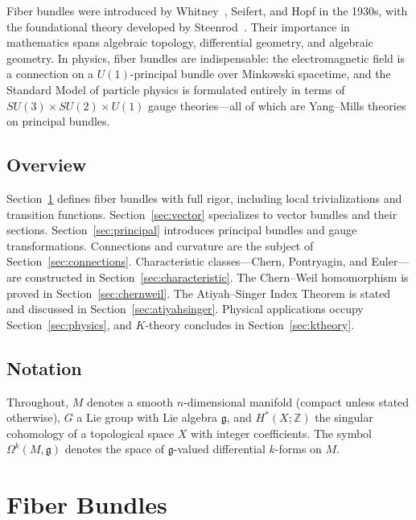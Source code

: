 \documentclass[12pt,a4paper]{amsart}
\theoremstyle{definition}
\begin{document}
Fiber bundles were introduced by Whitney~\cite{whitney1935}, Seifert, and Hopf
in the 1930s, with the foundational theory developed by Steenrod~\cite{steenrod1951}.
Their importance in mathematics spans algebraic topology, differential geometry,
and algebraic geometry. In physics, fiber bundles are indispensable: the
electromagnetic field is a connection on a $U(1)$-principal bundle over
Minkowski spacetime, and the Standard Model of particle physics is formulated
entirely in terms of $SU(3) \times SU(2) \times U(1)$ gauge theories---all of
which are Yang--Mills theories on principal bundles.

\subsection*{Overview}
Section~\ref{sec:bundles} defines fiber bundles with full rigor, including
local trivializations and transition functions. Section~\ref{sec:vector}
specializes to vector bundles and their sections.
Section~\ref{sec:principal} introduces principal bundles and gauge
transformations. Connections and curvature are the subject of
Section~\ref{sec:connections}. Characteristic classes---Chern, Pontryagin, and
Euler---are constructed in Section~\ref{sec:characteristic}. The
Chern--Weil homomorphism is proved in Section~\ref{sec:chernweil}.
The Atiyah--Singer Index Theorem is stated and discussed in
Section~\ref{sec:atiyahsinger}. Physical applications occupy
Section~\ref{sec:physics}, and $K$-theory concludes in
Section~\ref{sec:ktheory}.

\subsection*{Notation}
Throughout, $M$ denotes a smooth $n$-dimensional manifold (compact unless
stated otherwise), $G$ a Lie group with Lie algebra $\mathfrak{g}$, and
$H^*(X;\mathbb{Z})$ the singular cohomology of a topological space $X$ with
integer coefficients. The symbol $\Omega^k(M, \mathfrak{g})$ denotes the space
of $\mathfrak{g}$-valued differential $k$-forms on $M$.

\section{Fiber Bundles}
\label{sec:bundles}
\end{document}
